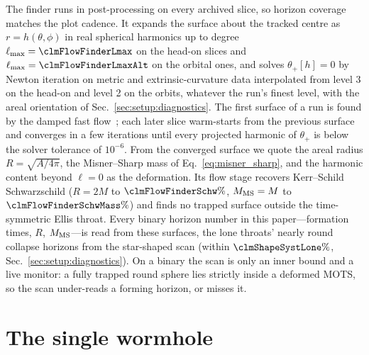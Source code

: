 \documentclass[twocolumn,floatfix,aps,prd,superscriptaddress,nofootinbib]{revtex4-2}
\begin{document}
The finder runs in post-processing on every archived slice, so horizon coverage matches the plot cadence. It
expands the surface about the tracked centre as $r=h(\theta,\phi)$ in real spherical harmonics up to degree
$\ell_{\max}=\clmFlowFinderLmax$ on the head-on slices and $\ell_{\max}=\clmFlowFinderLmaxAlt$ on the orbital
ones, and solves $\theta_+[h]=0$ by Newton iteration on metric and extrinsic-curvature data interpolated from
level 3 on the head-on and level 2 on the orbits, whatever the run's finest level, with the areal orientation of
Sec.~\ref{sec:setup:diagnostics}. The first surface of a run is found by the damped fast
flow~\cite{gundlach1998}; each later slice warm-starts from the previous surface and converges in a few
iterations until every projected harmonic of $\theta_+$ is below the solver tolerance of $10^{-6}$. From the converged surface
we quote the areal radius $R=\sqrt{A/4\pi}$, the Misner--Sharp mass of Eq.~\eqref{eq:misner_sharp}, and the
harmonic content beyond $\ell=0$ as the deformation. Its flow stage recovers Kerr--Schild Schwarzschild
($R=2M$ to $\clmFlowFinderSchw\%$, $M_{\rm MS}=M$ to $\clmFlowFinderSchwMass\%$) and finds no trapped surface
outside the time-symmetric Ellis throat. Every binary horizon number in this paper---formation times, $R$,
$M_{\rm MS}$---is read from these surfaces, the lone throats' nearly round collapse horizons from the star-shaped
scan (within $\clmShapeSystLone\%$, Sec.~\ref{sec:setup:diagnostics}). On a binary the scan is only an inner bound
and a live monitor: a fully trapped round sphere lies strictly inside a deformed MOTS, so the scan under-reads a
forming horizon, or misses it.

\section{The single wormhole}
\label{sec:single}
\end{document}
